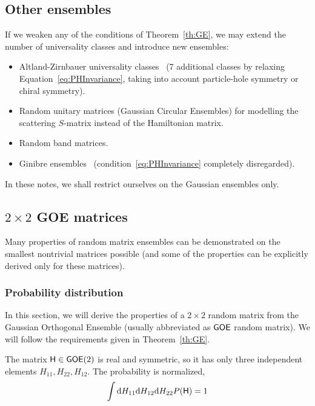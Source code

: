 \documentclass[a4paper,11pt,twoside]{article}
\begin{document}
    \subsection{Other ensembles}
    If we weaken any of the conditions of Theorem~\ref{th:GE}, we may extend the number of universality classes and introduce new ensembles:
    \begin{itemize}
        \item Altland-Zirnbauer universality classes~\cite{Alt97} (7 additional classes by relaxing Equation~\eqref{eq:PHInvariance}, taking into account particle-hole symmetry or chiral symmetry).
        \item Random unitary matrices (Gaussian Circular Ensembles) for modelling the scattering $S$-matrix instead of the Hamiltonian matrix.
        \item Random band matrices.
        \item Ginibre ensembles~\cite{Gin65} (condition~\eqref{eq:PHInvariance} completely disregarded).
    \end{itemize} 
    In these notes, we shall restrict ourselves on the Gaussian ensembles only.

    \subsection{$2\times2$ GOE matrices}\label{sec:NNSD22}
        Many properties of random matrix ensembles can be demonstrated on the smallest nontrivial matrices possible (and some of the properties can be explicitly derived only for these matrices).

        \subsubsection{Probability distribution}
            In this section, we will derive the properties of a $2\times2$ random matrix from the Gaussian Orthogonal Ensemble (usually abbreviated as $\mathsf{GOE}$ random matrix).
            We will follow the requirements given in Theorem~\ref{th:GE}.

            The matrix $\mathsf{H}\in\mathsf{GOE}(2)$ is real and symmetric, so it has only three independent elements $H_{11},H_{22},H_{12}$.
            The probability is normalized,
            \begin{equation}\label{eq:Hnorm}
                \int\mathrm{d} H_{11}\mathrm{d} H_{12}\mathrm{d} H_{22}P(\mathsf{H})=1
            \end{equation}
\end{document}
